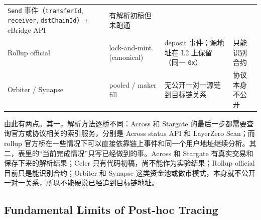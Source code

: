 \documentclass[12pt,a4paper]{ctexart}
\begin{document}
\begin{longtable}[]{@{}llll@{}}
\begin{minipage}[t]{0.22\columnwidth}
\texttt{Send} 事件（\texttt{transferId}, \texttt{receiver},
\texttt{dstChainId}）+ cBridge API\strut
\end{minipage} & \begin{minipage}[t]{0.22\columnwidth}\raggedright
有解析初稿但未跑通\strut
\end{minipage}\tabularnewline
\begin{minipage}[t]{0.22\columnwidth}\raggedright
Rollup official\strut
\end{minipage} & \begin{minipage}[t]{0.22\columnwidth}\raggedright
lock-and-mint (canonical)\strut
\end{minipage} & \begin{minipage}[t]{0.22\columnwidth}\raggedright
deposit 事件；源地址在 L2 上保留（同一 \texttt{0x}）\strut
\end{minipage} & \begin{minipage}[t]{0.22\columnwidth}\raggedright
只能识别合约\strut
\end{minipage}\tabularnewline
\begin{minipage}[t]{0.22\columnwidth}\raggedright
Orbiter / Synapse\strut
\end{minipage} & \begin{minipage}[t]{0.22\columnwidth}\raggedright
pooled / maker fill\strut
\end{minipage} & \begin{minipage}[t]{0.22\columnwidth}\raggedright
无公开一对一源链到目标链关系\strut
\end{minipage} & \begin{minipage}[t]{0.22\columnwidth}\raggedright
协议本身不公开\strut
\end{minipage}\tabularnewline
\bottomrule
\end{longtable}

由此有两点。其一，解析方法逐桥不同：Across 和 Stargate 的最后一步都需要查询官方或协议相关的索引服务，分别是 Across status API 和 LayerZero Scan；而 rollup 官方桥在一些情况下可以直接依靠链上事件和同一个用户地址继续分析。其二，表里的“当前完成情况”只写已经做到的事。Across 和 Stargate 有真实交易和保存下来的解析结果；Celer 只有代码初稿，尚不能作为实验结果；Rollup official 目前只是能识别合约；Orbiter 和 Synapse 这类资金池或做市模式，本身就不公开一对一关系，所以不能硬说已经追到目标链地址。

\hypertarget{fundamental-limits-of-post-hoc-tracing}{%
\subsection{Fundamental Limits of Post-hoc
Tracing}\label{fundamental-limits-of-post-hoc-tracing}}
\end{document}
